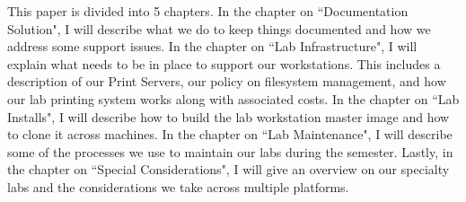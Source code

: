 This paper is divided into 5 chapters.  In the chapter on ``Documentation Solution", I will describe what we do to keep things documented and how we address some support issues.  In the chapter on ``Lab Infrastructure", I will explain what needs to be in place to support our workstations.  This includes a description of our Print Servers, our policy on filesystem management, and how our lab printing system works along with associated costs.  In the chapter on ``Lab Installs", I will describe how to build the lab workstation master image and how to clone it across machines.  In the chapter on ``Lab Maintenance", I will describe some of the processes we use to maintain our labs during the semester.  Lastly, in the chapter on ``Special Considerations", I will give an overview on our specialty labs and the considerations we take across multiple platforms.  

